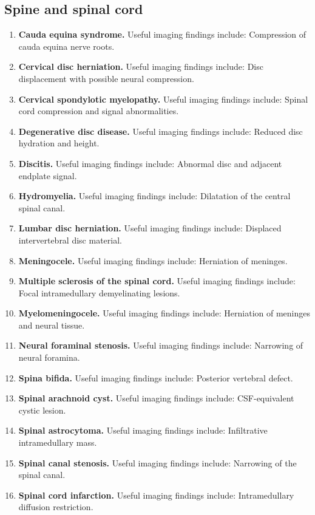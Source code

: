 \subsection{Spine and spinal cord}
\begin{enumerate}[leftmargin=*,itemsep=0.45em,topsep=0.4em]
\item \textbf{Cauda equina syndrome.} Useful imaging findings include: Compression of cauda equina nerve roots.
\item \textbf{Cervical disc herniation.} Useful imaging findings include: Disc displacement with possible neural compression.
\item \textbf{Cervical spondylotic myelopathy.} Useful imaging findings include: Spinal cord compression and signal abnormalities.
\item \textbf{Degenerative disc disease.} Useful imaging findings include: Reduced disc hydration and height.
\item \textbf{Discitis.} Useful imaging findings include: Abnormal disc and adjacent endplate signal.
\item \textbf{Hydromyelia.} Useful imaging findings include: Dilatation of the central spinal canal.
\item \textbf{Lumbar disc herniation.} Useful imaging findings include: Displaced intervertebral disc material.
\item \textbf{Meningocele.} Useful imaging findings include: Herniation of meninges.
\item \textbf{Multiple sclerosis of the spinal cord.} Useful imaging findings include: Focal intramedullary demyelinating lesions.
\item \textbf{Myelomeningocele.} Useful imaging findings include: Herniation of meninges and neural tissue.
\item \textbf{Neural foraminal stenosis.} Useful imaging findings include: Narrowing of neural foramina.
\item \textbf{Spina bifida.} Useful imaging findings include: Posterior vertebral defect.
\item \textbf{Spinal arachnoid cyst.} Useful imaging findings include: CSF-equivalent cystic lesion.
\item \textbf{Spinal astrocytoma.} Useful imaging findings include: Infiltrative intramedullary mass.
\item \textbf{Spinal canal stenosis.} Useful imaging findings include: Narrowing of the spinal canal.
\item \textbf{Spinal cord infarction.} Useful imaging findings include: Intramedullary diffusion restriction.

\end{enumerate}
